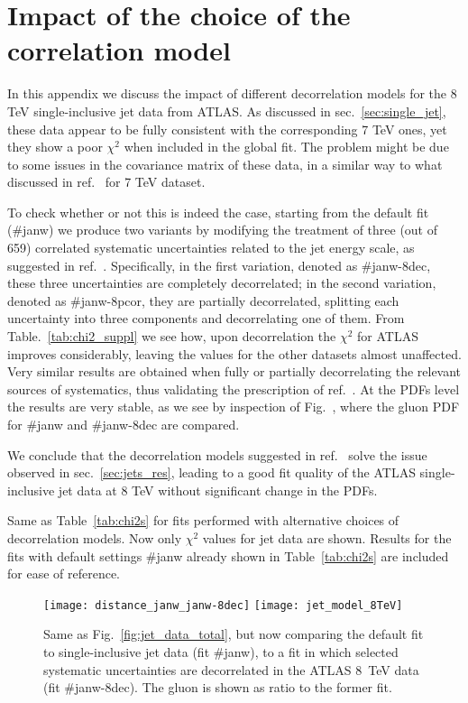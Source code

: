 
\chapter{Impact of the choice of the correlation model}
\label{app:jets}
In this appendix we discuss the impact of different decorrelation models for the 8 TeV single-inclusive jet data
from ATLAS.
As discussed in sec.~\ref{sec:single_jet}, these data appear to be fully consistent with the corresponding
7 TeV ones, yet they show a poor $\chi^2$ when included in the global fit.
The problem might be due to some issues in the covariance matrix of these data, in a similar way 
to what discussed in ref.~\cite{Harland-Lang:2017ytb} for 7 TeV dataset.

%
To check whether or not this is indeed the case, starting from the default fit (\#janw) we produce two variants 
by modifying the treatment of three (out of 659) correlated systematic uncertainties
related to the jet energy scale, as suggested in ref.~\cite{Aaboud:2017dvo}.
Specifically, in the first variation, denoted as \#janw-8dec, these three uncertainties are completely decorrelated;
in the second variation, denoted as \#janw-8pcor, they are partially decorrelated, splitting each uncertainty 
into three components and decorrelating one of them.
From Table.~\ref{tab:chi2_suppl} we see how, upon decorrelation the $\chi^2$ for ATLAS improves considerably, leaving the 
values for the other datasets almost unaffected. Very similar results are obtained when fully or partially 
decorrelating the relevant sources of systematics, thus validating the prescription of ref.~\cite{Aaboud:2017dvo}.
At the PDFs level the results are very stable, as we see by inspection of Fig.~, where the gluon PDF for 
\#janw and \#janw-8dec are compared.

%
We conclude that the decorrelation models suggested in ref.~\cite{Aaboud:2017dvo} solve the issue observed in
sec.~\ref{sec:jets_res}, leading to a good fit quality of the ATLAS single-inclusive jet data at 8 TeV without
significant change in the PDFs.

\begin{table}[!t]
    \renewcommand*{\arraystretch}{1.60}
    \scriptsize
    \centering
    
    \vspace{0.3cm}
    \caption{Same as Table~\ref{tab:chi2s} for
      fits performed with alternative choices of decorrelation models.
      Now only $\chi^2$ values for jet data are shown. Results for the fits with default settings
      \#janw already shown  in Table~\ref{tab:chi2s} are included for ease of reference.}
    \label{tab:chi2_suppl}
\end{table}

\begin{figure}[!t]
    \centering
    \texttt{[image: distance\_janw\_janw-8dec]}
    \texttt{[image: jet\_model\_8TeV]}\\
    \caption{Same as Fig.~\ref{fig:jet_data_total}, but now comparing
      the default fit to single-inclusive jet data (fit \#janw), to a fit in which selected systematic uncertainties
      are decorrelated in the ATLAS 8~TeV data (fit \#janw-8dec). The gluon is  shown as ratio to the former fit.}
    \label{fig:jet_data_model_8TeV} 
\end{figure}